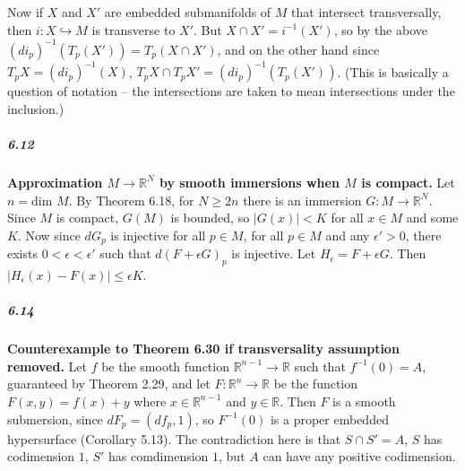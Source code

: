 \documentclass[10pt,letter]{article}
\begin{document}
Now if $X$ and $X'$ are embedded submanifolds of $M$ that intersect transversally, then $i: X \hookrightarrow M$ is transverse to $X'$. But $X \cap X' = i^{-1}(X')$, so by the above $(di_p)^{-1}(T_p(X')) = T_p(X \cap X')$, and on the other hand since $T_pX = (di_p)^{-1}(X)$, $T_pX \cap T_pX' = (di_p)^{-1}(T_p(X'))$. (This is basically a question of notation -- the intersections are taken to mean intersections under the inclusion.) 

\subparagraph{6.12} {\bf Approximation $M \rightarrow \mathbb{R}^N$ by smooth immersions when $M$ is compact.} Let $n = \text{dim }M$. By Theorem 6.18, for $N \geq 2n$ there is an immersion $G: M \rightarrow \mathbb{R}^N$. Since $M$ is compact, $G(M)$ is bounded, so $\vert G(x) \vert < K$ for all $x \in M$ and some $K$. Now since $dG_p$ is injective for all $p \in M$, for all $p \in M$ and any $\epsilon' > 0$, there exists $0 < \epsilon < \epsilon'$ such that $d(F + \epsilon G)_p$ is injective. Let $H_{\epsilon} = F + \epsilon G$. Then $\vert H_{\epsilon}(x) - F(x) \vert \leq \epsilon K$. 

\subparagraph{6.14} {\bf Counterexample to Theorem 6.30 if transversality assumption removed.} Let $f$ be the smooth function $\mathbb{R}^{n-1} \rightarrow \mathbb{R}$ such that $f^{-1}(0) = A$, guaranteed by Theorem 2.29, and let $F: \mathbb{R}^{n} \rightarrow \mathbb{R}$ be the function $F(x,y) = f(x) + y$ where $x \in \mathbb{R}^{n-1}$ and $y \in \mathbb{R}$. Then $F$ is a smooth submersion, since $dF_p = (df_p,1)$, so $F^{-1}(0)$ is a proper embedded hypersurface (Corollary 5.13). The contradiction here is that $S \cap S' = A$, $S$ has codimension $1$, $S'$ has comdimension $1$, but $A$ can have any positive codimension.
\end{document}
